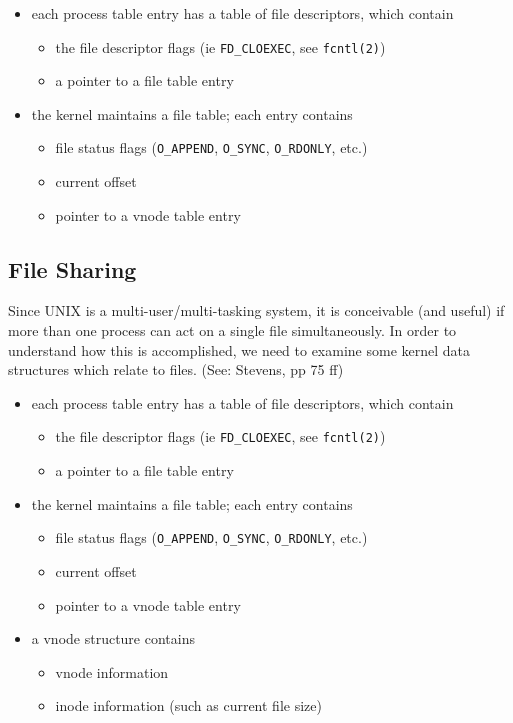\documentclass[xga]{xdvislides}
\begin{document}
\begin{itemize}
	\item each process table entry has a table of file descriptors, which contain
		\begin{itemize}
			\item the file descriptor flags (ie {\tt FD\_CLOEXEC}, see \verb+fcntl(2)+)
			\item a pointer to a file table entry
		\end{itemize}
	\item the kernel maintains a file table;  each entry contains
		\begin{itemize}
			\item file status flags (\verb+O_APPEND+, \verb+O_SYNC+, \verb+O_RDONLY+, etc.)
			\item current offset
			\item pointer to a vnode table entry
		\end{itemize}
\end{itemize}

\subsection{File Sharing}
Since UNIX is a multi-user/multi-tasking system, it is conceivable (and useful)
if more than one process can act on a single file simultaneously. In
order to understand how this is accomplished, we need to examine some kernel
data structures which relate to files.  (See: Stevens, pp 75 ff)

\begin{itemize}
	\item each process table entry has a table of file descriptors, which
		contain
		\begin{itemize}
			\item the file descriptor flags (ie {\tt FD\_CLOEXEC}, see \verb+fcntl(2)+)
			\item a pointer to a file table entry
		\end{itemize}
	\item the kernel maintains a file table;  each entry contains
		\begin{itemize}
			\item file status flags (\verb+O_APPEND+, \verb+O_SYNC+, \verb+O_RDONLY+, etc.)
			\item current offset
			\item pointer to a vnode table entry
		\end{itemize}
	\item a vnode structure contains
		\begin{itemize}
			\item vnode information
			\item inode information (such as current file size)
		\end{itemize}
\end{itemize}
\end{document}
